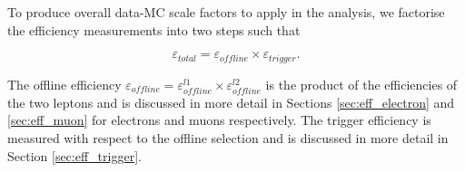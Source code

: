 To produce overall data-MC scale factors to apply in the analysis, we factorise the efficiency measurements
into two steps such that

\begin{equation}
\varepsilon_{total} = \varepsilon_{offline} \times \varepsilon_{trigger}.
\end{equation}

The offline efficiency $\varepsilon_{offline} = \varepsilon_{offline}^{l1} \times \varepsilon_{offline}^{l2}$
is the product of the efficiencies of the two leptons and is discussed in more detail in Sections \ref{sec:eff_electron}
and \ref{sec:eff_muon} for electrons and muons respectively.
The trigger efficiency is measured with respect to the offline selection and
is discussed in more detail in Section \ref{sec:eff_trigger}.

